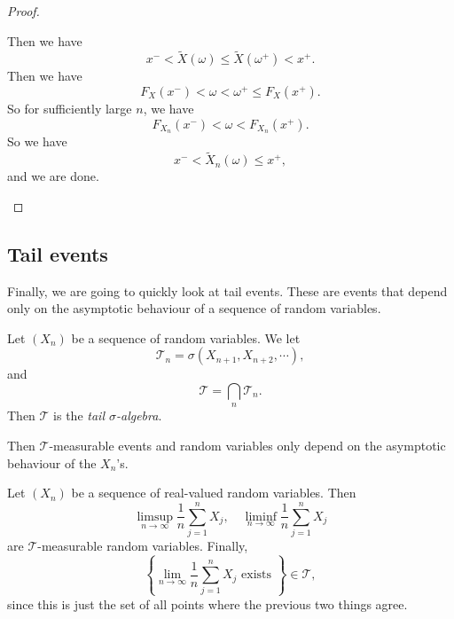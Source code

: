 \documentclass[a4paper]{article}
\begin{document}
\begin{proof}
\begin{enumerate}
\begin{center}
       \end{center}
       Then we have
       \[
         x^- < \tilde{X}(\omega) \leq \tilde{X}(\omega^+) < x^+.
       \]
       Then we have
       \[
         F_X(x^-) < \omega < \omega^+ \leq F_X(x^+).
       \]
       So for sufficiently large $n$, we have
       \[
         F_{X_n}(x^-) < \omega < F_{X_n}(x^+).
       \]
       So we have
       \[
         x^- < \tilde{X}_n(\omega) \leq x^+,
       \]
       and we are done.\qedhere
  \end{enumerate}
\end{proof}

\subsection{Tail events}
Finally, we are going to quickly look at tail events. These are events that depend only on the asymptotic behaviour of a sequence of random variables.
\begin{defi}
  Let $(X_n)$ be a sequence of random variables. We let
  \[
    \mathcal{T}_n = \sigma(X_{n + 1}, X_{n + 2}, \cdots),
  \]
  and
  \[
    \mathcal{T} = \bigcap_n \mathcal{T}_n.
  \]
  Then $\mathcal{T}$ is the \emph{tail $\sigma$-algebra}.
\end{defi}
Then $\mathcal{T}$-measurable  events and random variables only depend on the asymptotic behaviour of the $X_n$'s.

\begin{eg}
  Let $(X_n)$ be a sequence of real-valued random variables. Then
  \[
    \limsup_{n \to \infty} \frac{1}{n} \sum_{j = 1}^n X_j,\quad \liminf_{n \to \infty} \frac{1}{n} \sum_{j = 1}^n X_j
  \]
  are $\mathcal{T}$-measurable random variables. Finally,
  \[
    \left\{\lim_{n \to \infty} \frac{1}{n} \sum_{j = 1}^n X_j\text{ exists }\right\} \in \mathcal{T},
  \]
  since this is just the set of all points where the previous two things agree.
\end{eg}
\end{document}
